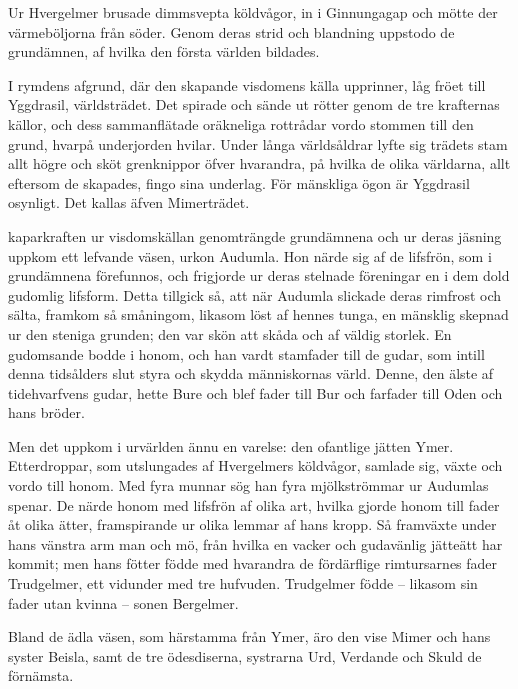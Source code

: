 Ur Hvergelmer brusade dimmsvepta köldvågor, in i Ginnungagap och mötte
der värmeböljorna från söder. Genom deras strid och blandning uppstodo
de grundämnen, af hvilka den första världen bildades.

I rymdens afgrund, där den skapande visdomens källa upprinner, låg fröet
till Yggdrasil, världsträdet. Det spirade och sände ut rötter genom de
tre krafternas källor, och dess sammanflätade oräkneliga rottrådar vordo
stommen till den grund, hvarpå underjorden hvilar. Under långa
världsåldrar lyfte sig trädets stam allt högre och sköt grenknippor
öfver hvarandra, på hvilka de olika världarna, allt eftersom de
skapades, fingo sina underlag. För mänskliga ögon är Yggdrasil osynligt.
Det kallas äfven Mimerträdet.

\endSecII


\dropcapS kaparkraften ur visdomskällan genomträngde grundämnena och ur deras
jäsning uppkom ett lefvande väsen, urkon Audumla. Hon närde sig af de
lifsfrön, som i grundämnena förefunnos, och frigjorde ur deras stelnade
föreningar en i dem dold gudomlig lifsform. Detta tillgick så, att när
Audumla slickade deras rimfrost och sälta, framkom så småningom, likasom
löst af hennes tunga, en mänsklig skepnad ur den steniga grunden; den
var skön att skåda och af väldig storlek. En gudomsande bodde i honom,
och han vardt stamfader till de gudar, som intill denna tidsålders slut
styra och skydda människornas värld. Denne, den älste af tidehvarfvens
gudar, hette Bure och blef fader till Bur och farfader till Oden och
hans bröder.

Men det uppkom i urvärlden ännu en varelse: den ofantlige jätten Ymer.
Etterdroppar, som utslungades af Hvergelmers köldvågor, samlade sig,
växte och vordo till honom. Med fyra munnar sög han fyra mjölkströmmar
ur Audumlas spenar. De närde honom med lifsfrön af olika art, hvilka
gjorde honom till fader åt olika ätter, framspirande ur olika lemmar af
hans kropp. Så framväxte under hans vänstra arm man och mö, från hvilka
en vacker och gudavänlig jätteätt har kommit; men hans fötter födde med
hvarandra de
fördärflige rimtursarnes fader Trudgelmer, ett vidunder med tre
hufvuden. Trudgelmer födde -- likasom sin fader utan kvinna -- sonen
Bergelmer.

Bland de ädla väsen, som härstamma från Ymer, äro den vise Mimer och
hans syster Beisla, samt de tre ödesdiserna, systrarna Urd, Verdande och
Skuld de förnämsta.

\endSecII

